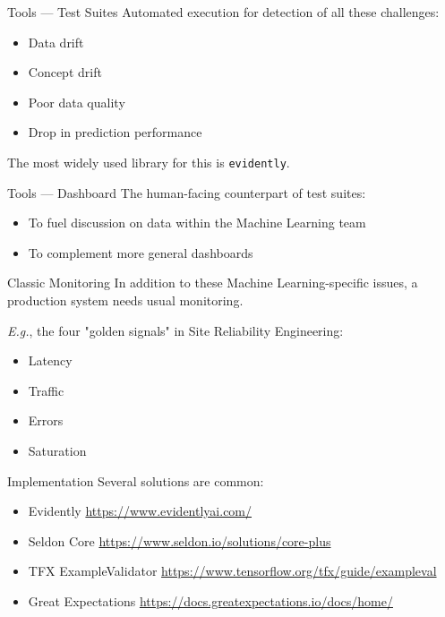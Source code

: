\begin{frame}{Tools — Test Suites}
  Automated execution for detection of all these challenges:
  \begin{itemize}
    \item Data drift
    \item Concept drift
    \item Poor data quality
    \item Drop in prediction performance
  \end{itemize}
  The most widely used library for this is \texttt{evidently}.

  \hugo
\end{frame}


\begin{frame}{Tools — Dashboard}
  The human-facing counterpart of test suites:

  \begin{itemize}
    \item To fuel discussion on data within the Machine Learning team
    \item To complement more general dashboards
  \end{itemize}

  \hugo
\end{frame}


\begin{frame}{Classic Monitoring}
  In addition to these Machine Learning-specific issues, a production system needs usual monitoring.

  \textit{E.g.}, the four "golden signals" in Site Reliability Engineering:

  \begin{itemize}
    \item Latency
    \item Traffic
    \item Errors
    \item Saturation
  \end{itemize}

  \hugo
\end{frame}


\begin{frame}{Implementation}
  Several solutions are common:

  \begin{itemize}
    \item {Evidently} \url{https://www.evidentlyai.com/}
    \item {Seldon Core} \url{https://www.seldon.io/solutions/core-plus}
    \item {TFX ExampleValidator} \url{https://www.tensorflow.org/tfx/guide/exampleval}
    \item {Great Expectations} \url{https://docs.greatexpectations.io/docs/home/}
  \end{itemize}

  \hugo
\end{frame}





\begin{frame}
\end{frame}



